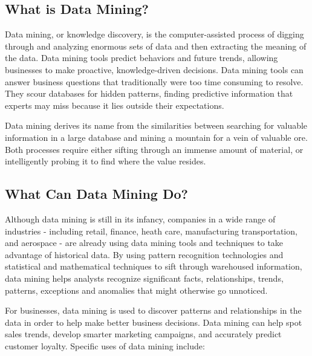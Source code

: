 \subsection{What is Data Mining?}
Data mining, or knowledge discovery, is the computer-assisted process of digging through and analyzing enormous sets of data and then extracting the meaning of the data. Data mining tools predict behaviors and future trends, allowing businesses to make proactive, knowledge-driven decisions. Data mining tools can answer business questions that traditionally were too time consuming to resolve. They scour databases for hidden patterns, finding predictive information that experts may miss because it lies outside their expectations.

Data mining derives its name from the similarities between searching for valuable information in a large database and mining a mountain for a vein of valuable ore. Both processes require either sifting through an immense amount of material, or intelligently probing it to find where the value resides.

\subsection{What Can Data Mining Do?}
Although data mining is still in its infancy, companies in a wide range of industries - including retail, finance, heath care, manufacturing transportation, and aerospace - are already using data mining tools and techniques to take advantage of historical data. By using pattern recognition technologies and statistical and mathematical techniques to sift through warehoused information, data mining helps analysts recognize significant facts, relationships, trends, patterns, exceptions and anomalies that might otherwise go unnoticed.

For businesses, data mining is used to discover patterns and relationships in the data in order to help make better business decisions. Data mining can help spot sales trends, develop smarter marketing campaigns, and accurately predict customer loyalty. Specific uses of data mining include:

